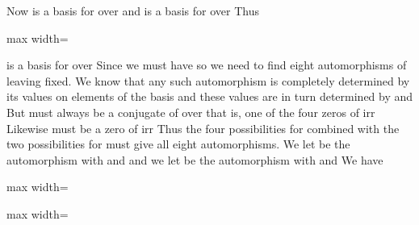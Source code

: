 \documentclass[11pt,oneside]{article}
\begin{document}
\begin{BookBody}
Now  is a basis for  over  and  is a basis for  over  Thus

\begin{center}\begin{adjustbox}{max width=\linewidth}\end{adjustbox}\end{center}

\noindent is a basis for  over  Since  we must have  so we need to find eight automorphisms of  leaving  fixed. We know that any such automorphism \BookInline{\sigma } is completely determined by its values on elements of the basis   and these values are in turn determined by \BookInline{\sigma (\alpha )} and  But \BookInline{\sigma (\alpha )} must always be a conjugate of \BookInline{\alpha } over  that is, one of the four zeros of irr Likewise must be a zero of irr Thus the four possibilities for \BookInline{\sigma (\alpha ),\allowbreak } combined with the two possibilities for  must give all eight automorphisms. We let  be the automorphism with  and  and we let  be the automorphism with \BookInline{\mu (\alpha )= \alpha } and  We have

\begin{center}\begin{adjustbox}{max width=\linewidth}\end{adjustbox}\end{center}

\begin{center}\begin{adjustbox}{max width=\linewidth}\end{adjustbox}\end{center}

\end{BookBody}
\end{document}
